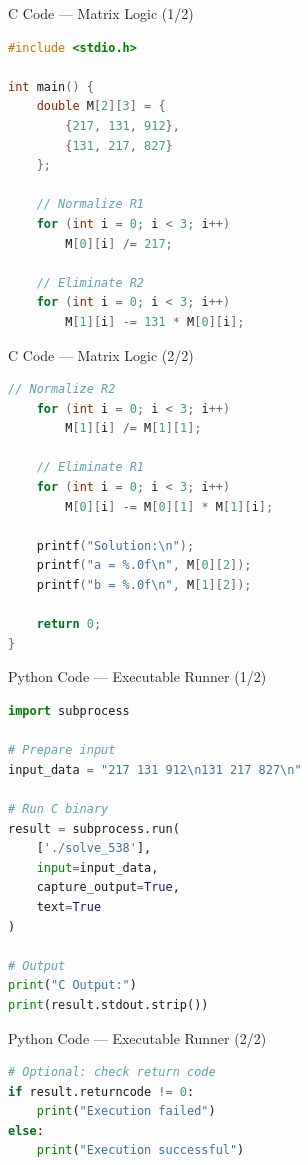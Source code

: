 \documentclass{beamer}
\begin{document}
\begin{frame}[fragile]{C Code — Matrix Logic (1/2)}
\begin{lstlisting}[language=C]
#include <stdio.h>

int main() {
    double M[2][3] = {
        {217, 131, 912},
        {131, 217, 827}
    };

    // Normalize R1
    for (int i = 0; i < 3; i++)
        M[0][i] /= 217;

    // Eliminate R2
    for (int i = 0; i < 3; i++)
        M[1][i] -= 131 * M[0][i];
\end{lstlisting}
\end{frame}

\begin{frame}[fragile]{C Code — Matrix Logic (2/2)}
\begin{lstlisting}[language=C]
    // Normalize R2
    for (int i = 0; i < 3; i++)
        M[1][i] /= M[1][1];

    // Eliminate R1
    for (int i = 0; i < 3; i++)
        M[0][i] -= M[0][1] * M[1][i];

    printf("Solution:\n");
    printf("a = %.0f\n", M[0][2]);
    printf("b = %.0f\n", M[1][2]);

    return 0;
}
\end{lstlisting}
\end{frame}

\begin{frame}[fragile]{Python Code — Executable Runner (1/2)}
\begin{lstlisting}[language=Python]
import subprocess

# Prepare input
input_data = "217 131 912\n131 217 827\n"

# Run C binary
result = subprocess.run(
    ['./solve_538'],
    input=input_data,
    capture_output=True,
    text=True
)

# Output
print("C Output:")
print(result.stdout.strip())
\end{lstlisting}
\end{frame}

\begin{frame}[fragile]{Python Code — Executable Runner (2/2)}
\begin{lstlisting}[language=Python]
# Optional: check return code
if result.returncode != 0:
    print("Execution failed")
else:
    print("Execution successful")
\end{lstlisting}
\end{frame}
\end{document}
